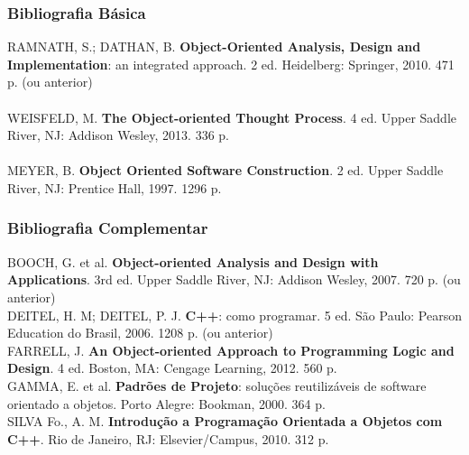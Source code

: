 \documentclass[aspectratio=169]{beamer}
\begin{document}
\begin{frame}\frametitle{Bibliografia Básica}
RAMNATH, S.; DATHAN, B. \textbf{Object-Oriented Analysis, Design and Implementation}: an integrated approach. 2 ed. Heidelberg: Springer, 2010. 471 p. (ou anterior)\\
~\\
WEISFELD, M. \textbf{The Object-oriented Thought Process}. 4 ed. Upper Saddle River, NJ: Addison Wesley, 2013. 336 p.\\
~\\
MEYER, B. \textbf{Object Oriented Software Construction}. 2 ed. Upper Saddle River, NJ: Prentice Hall, 1997. 1296 p.
\end{frame}

\begin{frame}\frametitle{Bibliografia Complementar}
BOOCH, G. et al. \textbf{Object-oriented Analysis and Design with Applications}. 3rd ed. Upper Saddle River, NJ: Addison Wesley, 2007. 720 p. (ou anterior)\\
DEITEL, H. M; DEITEL, P. J. \textbf{C++}: como programar. 5 ed. São Paulo: Pearson Education do Brasil, 2006. 1208 p. (ou anterior)\\
FARRELL, J. \textbf{An Object-oriented Approach to Programming Logic and Design}. 4 ed. Boston, MA: Cengage Learning, 2012. 560 p.\\
GAMMA, E. et al. \textbf{Padrões de Projeto}: soluções reutilizáveis de software orientado a objetos. Porto Alegre: Bookman, 2000. 364 p.\\
SILVA Fo., A. M. \textbf{Introdução a Programação Orientada a Objetos com C++}. Rio de Janeiro, RJ: Elsevier/Campus, 2010. 312 p.
\end{frame}
\end{document}

